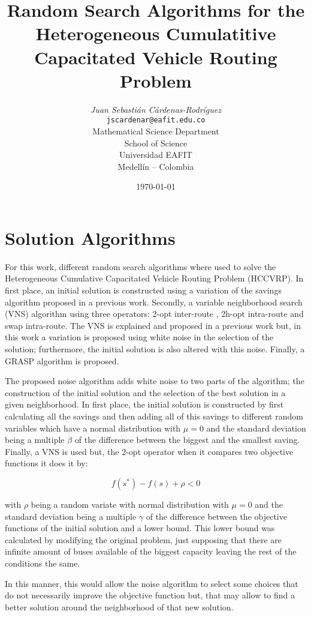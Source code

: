 \documentclass[10pt,twoside]{article}
\title{Random Search Algorithms for the Heterogeneous Cumulatitive Capacitated Vehicle Routing Problem}
\author{\emph{Juan Sebastián Cárdenas-Rodríguez}\\
\vspace{0.3cm}
\small{\tt{jscardenar@eafit.edu.co}}\\
Mathematical Science Department\\
School of Science\\
Universidad EAFIT\\
Medellín -- Colombia}
\date{\today}
\begin{document}
\maketitle

\thispagestyle{firststyle}


\section{Solution Algorithms}\label{sec_alg}
For this work, different random search algorithms where used to solve
the Heterogeneous Cumulative Capacitated Vehicle Routing Problem
(HCCVRP). In first place, an initial solution is constructed using a
variation of the savings algorithm \citep{clarke1964} proposed in a
previous work. Secondly, a variable neighborhood search (VNS)
algorithm using three operators: 2-opt inter-route \citep{croes1958},
2h-opt intra-route \citep{bentley1992} and swap intra-route. The VNS
is explained and proposed in a previous work but, in this work a
variation is proposed using white noise in the selection of the
solution; furthermore, the initial solution is also altered with this
noise. Finally, a GRASP algorithm \citep{binato2001} is proposed.

The proposed noise algorithm adds white noise to two parts of the
algorithm; the construction of the initial solution and the selection
of the best solution in a given neighborhood. In first place, the
initial solution is constructed by first calculating all the savings
and then adding all of this savings to different random variables
which have a normal distribution with $\mu = 0$ and the standard
deviation being a multiple $\beta$ of the difference between the
biggest and the smallest saving. Finally, a VNS is used but, the
2-opt operator when it compares two objective functions it does it
by:

\begin{equation}
  f(s^*) - f(s) + \rho < 0
\end{equation}

with $\rho$ being a random variate with normal distribution with
$\mu=0$ and the standard deviation being a multiple $\gamma$ of the
difference between the objective functions of the initial solution
and a lower bound. This lower bound was calculated by modifying the
original problem, just supposing that there are infinite amount of
buses available of the biggest capacity leaving the rest of the
conditions the same.

In this manner, this would allow the noise algorithm to select some
choices that do not necessarily improve the objective function but,
that may allow to find a better solution around the neighborhood of
that new solution.
\end{document}
